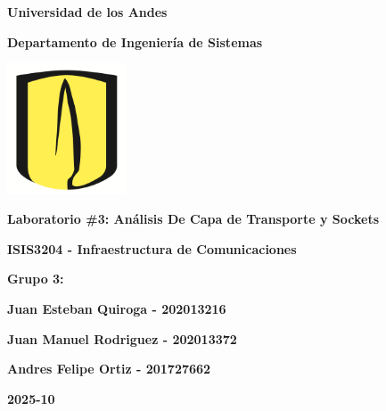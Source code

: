 \documentclass[10pt]{article}
\title{ }
\begin{document}
\begingroup
\let\clearpage\relax %
\thispagestyle{empty}
\begin{center}
{\huge \bfseries Universidad de los Andes}

\vspace{25pt}
{\LARGE \bfseries Departamento de Ingeniería de Sistemas}

\vspace{15pt}
\includegraphics[width=100pt]{images/logo.png} 

\vspace{35pt}
{\LARGE \bfseries Laboratorio \#3: Análisis De Capa de Transporte y Sockets}
\vspace{55pt}

{\Large \bfseries ISIS3204 - Infraestructura de Comunicaciones}


\vspace{100pt}
{\Large \bfseries Grupo 3: }

\end{center}

\begin{flushleft}
  \setlength{\parskip}{0pt}
  \setlength{\itemsep}{0pt}
  \hspace*{4cm}\large\bfseries Juan Esteban Quiroga - 202013216

  \hspace*{4cm}\large\bfseries Juan Manuel Rodriguez - 202013372

  \hspace*{4cm}\large\bfseries Andres Felipe Ortiz - 201727662
\end{flushleft}

\begin{center}
\vspace{60pt}

\Large\bfseries 2025-10
\end{center}

\mbox{}
\endgroup

\clearpage

\tableofcontents
\clearpage


\renewcommand{\thesection}{\arabic{section}}
\end{document}
